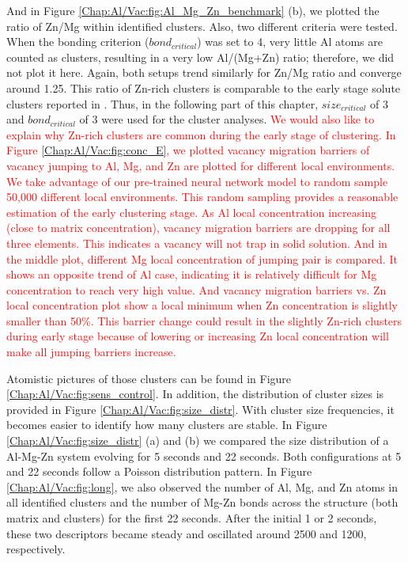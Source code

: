 And in Figure \ref{Chap:Al/Vac:fig:Al_Mg_Zn_benchmark} (b), we plotted the ratio of Zn/Mg within identified clusters. Also, two different criteria were tested. When the bonding criterion ($bond_{critical}$) was set to 4, very little Al atoms are counted as clusters, resulting in a very low Al/(Mg+Zn) ratio; therefore, we did not plot it here. Again, both setups trend similarly for Zn/Mg ratio and converge around 1.25. This ratio of Zn-rich clusters is comparable to the early stage solute clusters reported in \cite{liu2020formation}. Thus, in the following part of this chapter, $size_{critical}$ of 3 and $bond_{critical}$ of 3 were used for the cluster analyses. \textcolor{red}{We would also like to explain why Zn-rich clusters are common during the early stage of clustering. In Figure \ref{Chap:Al/Vac:fig:conc_E}, we plotted vacancy migration barriers of vacancy jumping to Al, Mg, and Zn are plotted for different local environments. We take advantage of our pre-trained neural network model to random sample 50,000 different local environments. This random sampling provides a reasonable estimation of the early clustering stage. As Al local concentration increasing (close to matrix concentration), vacancy migration barriers are dropping for all three elements. This indicates a vacancy will not trap in solid solution. And in the middle plot, different Mg local concentration of jumping pair is compared. It shows an opposite trend of Al case, indicating it is relatively difficult for Mg concentration to reach very high value. And vacancy migration barriers vs. Zn local concentration plot show a local minimum when Zn concentration is slightly smaller than 50\%. This barrier change could result in the slightly Zn-rich clusters during early stage because of lowering or increasing Zn local concentration will make all jumping barriers increase.}


Atomistic pictures of those clusters can be found in Figure \ref{Chap:Al/Vac:fig:sens_control}. In addition, the distribution of cluster sizes is provided in Figure \ref{Chap:Al/Vac:fig:size_distr}. With cluster size frequencies, it becomes easier to identify how many clusters are stable. In Figure \ref{Chap:Al/Vac:fig:size_distr} (a) and (b) we compared the size distribution of a Al-Mg-Zn system evolving for 5 seconds and 22 seconds. Both configurations at 5 and 22 seconds follow a Poisson distribution pattern. In Figure \ref{Chap:Al/Vac:fig:long}, we also observed the number of Al, Mg, and Zn atoms in all identified clusters and the number of Mg-Zn bonds across the structure (both matrix and clusters) for the first 22 seconds. After the initial 1 or 2 seconds, these two descriptors became steady and oscillated around 2500 and 1200, respectively.


